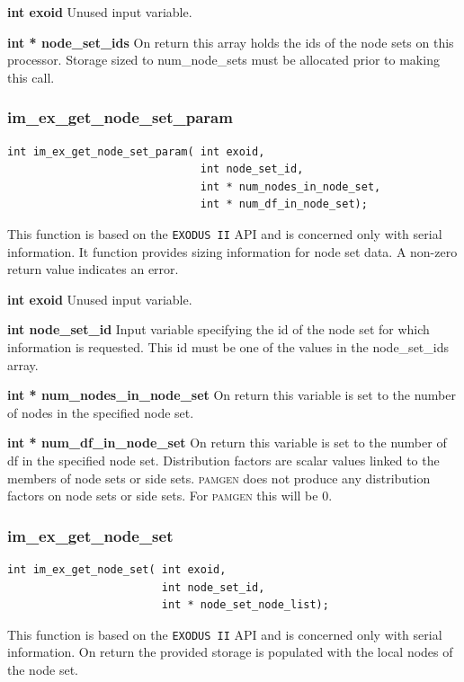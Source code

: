 {\setlength{\parindent}{0pt}
 \textbf{int exoid} Unused input variable.}

{\setlength{\parindent}{0pt}
 \textbf{int * node\_set\_ids}  On return this array holds the ids of the node sets on this processor.  Storage sized to num\_node\_sets must be allocated prior to making this call.}


\subsubsection{im\_ex\_get\_node\_set\_param}
{\ttfamily  \begin{verbatim}
int im_ex_get_node_set_param( int exoid,
                              int node_set_id,
                              int * num_nodes_in_node_set,
                              int * num_df_in_node_set);
\end{verbatim}}
This function is based on the \texttt{EXODUS II} API and is concerned only with serial information. It function provides sizing information for node set data. A non-zero return value indicates an error.

{\setlength{\parindent}{0pt}
 \textbf{int exoid} Unused input variable.}

{\setlength{\parindent}{0pt}
 \textbf{int node\_set\_id}  Input variable specifying the id of the node set for which information is requested. This id must be one of the values in the node\_set\_ids array.}

{\setlength{\parindent}{0pt}
 \textbf{int * num\_nodes\_in\_node\_set}  On return this variable is set to the number of nodes in the specified node set.}

{\setlength{\parindent}{0pt}
 \textbf{int * num\_df\_in\_node\_set}  On return this variable is set to the number of df in the specified node set. Distribution factors are scalar values linked to the members of node sets or side sets. \textsc{pamgen} does not produce any distribution factors on node sets or side sets. For \textsc{pamgen} this will be 0.}


\subsubsection{im\_ex\_get\_node\_set}
{\ttfamily  \begin{verbatim}
int im_ex_get_node_set( int exoid,
                        int node_set_id,
                        int * node_set_node_list);
\end{verbatim}}
This function is based on the \texttt{EXODUS II} API and is concerned only with serial information. On return the provided storage is populated with the local nodes of the node set.

